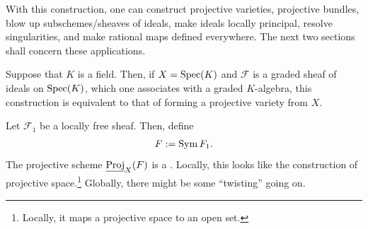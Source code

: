 \documentclass [11 pt, oneside] {article}
\begin{document}
With this construction, one can construct projective varieties, projective bundles, blow up subschemes/sheaves of ideals, make ideals locally principal, resolve singularities, and make rational maps defined everywhere.
The next two sections shall concern these applications.

Suppose that $K$ is a field. Then, if $X=\operatorname{Spec} (K)$ and $\mathscr{F}$ is a graded sheaf of ideals on $\operatorname{Spec} (K)$, which one associates with a graded $K$-algebra, this construction is equivalent to that of forming a projective variety from $X$.

Let $\mathscr{F}_1$ be a locally free sheaf. Then, define
\begin{align*}
	\relax{F}:= \operatorname{Sym} \relax{F}_1.
\end{align*}
The projective scheme $\underline{\operatorname{Proj}}_X(\relax{F})$ is a . Locally, this looks like the construction of projective space.\footnote{Locally, it maps a projective space to an open set.}
Globally, there might be some ``twisting'' going on.
\end{document}
